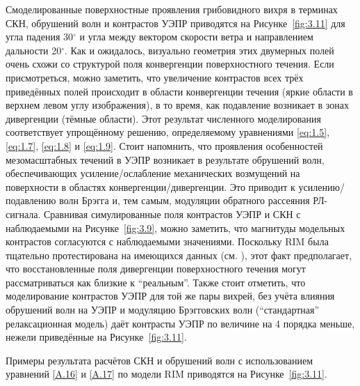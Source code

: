 Смоделированные поверхностные проявления грибовидного вихря в терминах СКН, обрушений волн и контрастов УЭПР приводятся на Рисунке~\ref{fig:3.11} для угла падения 30${}^\circ$ и угла между вектором скорости ветра и направлением дальности 20${}^\circ$. Как и ожидалось, визуально геометрия этих двумерных полей очень схожи со структурой поля конвергенции поверхностного течения. Если присмотреться, можно заметить, что увеличение контрастов всех трёх приведённых полей происходит в области конвергенции течения (яркие области в верхнем левом углу изображения), в то время, как подавление возникает в зонах дивергенции (тёмные области). Этот результат численного моделирования соответствует упрощённому решению, определяемому уравнениями \eqref{eq:1.5}, \eqref{eq:1.7}, \eqref{eq:1.8} и \eqref{eq:1.9}. Стоит напомнить, что проявления особенностей мезомасштабных течений в УЭПР возникает в результате обрушений волн, обеспечивающих усиление/ослабление механических возмущений на поверхности в областях конвергенции/дивергенции. Это приводит к усилению/подавлению волн Брэгга и, тем самым, модуляции обратного рассеяния РЛ-сигнала. Сравнивая симулированные поля контрастов УЭПР и СКН с наблюдаемыми на Рисунке~\ref{fig:3.9}, можно заметить, что магнитуды модельных контрастов согласуются с наблюдаемыми значениями. Поскольку RIM была тщательно протестирована на имеющихся данных (см. \citep{Kudryavtsev2005}), этот факт предполагает, что восстановленные поля дивергенции поверхностного течения могут рассматриваться как близкие к ``реальным''. Также стоит отметить, что моделирование контрастов УЭПР для той же пары вихрей, без учёта влияния обрушений волн на УЭПР и модуляцию Брэгговских волн (``стандартная'' релаксационная модель) даёт контрасты УЭПР по величине на 4 порядка меньше, нежели приведённые на Рисунке~\ref{fig:3.11}.

Примеры результата расчётов СКН и обрушений волн с использованием уравнений \eqref{A.16} и \eqref{A.17} по модели RIM приводятся на Рисунке~\ref{fig:3.11}.

